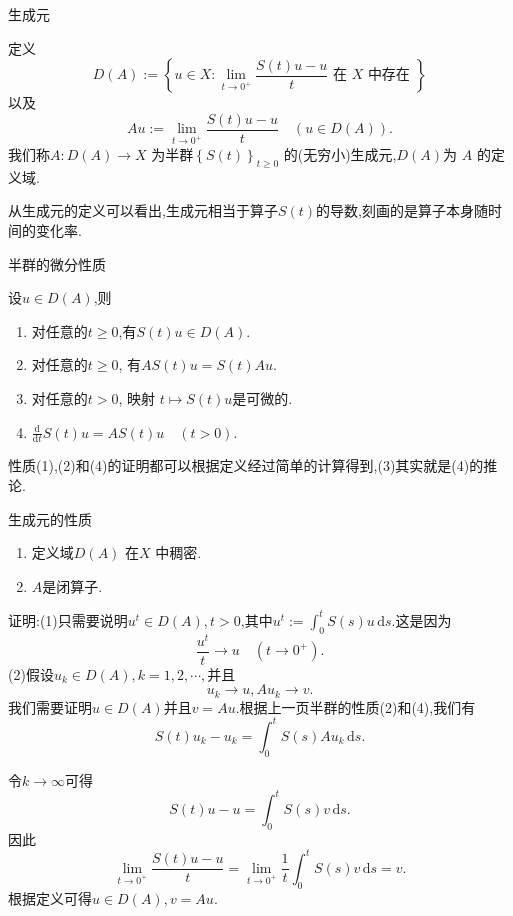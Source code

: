 \begin{frame}[t]{生成元}
  \begin{definition}
    定义
    \begin{equation}
      D(A):=\left\{u\in X: \lim_{t\to 0^{+}}\frac{S(t)u-u}{t}\text{ 在 } X  \text{ 中存在 }\right\}
    \end{equation}
    以及
    \begin{equation}
      Au:=\lim_{t\to 0^{+}}\frac{S(t)u-u}{t}\quad (u\in D(A)).
    \end{equation}
    我们称$A:D(A)\to X$ 为半群$\left\{S(t)\right\} _{t\ge 0}$ 的(无穷小)生成元,$D(A)$为 $A$ 的定义域.
  \end{definition}
  从生成元的定义可以看出,生成元相当于算子$S(t)$的导数,刻画的是算子本身随时间的变化率. 
\end{frame}
\begin{frame}[t]{半群的微分性质}
  \begin{theorem}
    设$u\in D(A)$,则
    \begin{enumerate}
      \item 对任意的$t\ge 0$,有$S(t)u \in D(A)$.
      \item 对任意的$t\ge 0$, 有$AS(t)u=S(t)Au$.
      \item 对任意的$t>0$, 映射 $t\mapsto S(t)u$是可微的.
      \item  $\frac{\mathrm{d}}{\mathrm{d}t}S(t)u=AS(t)u \quad (t>0)$.
    \end{enumerate}
  \end{theorem}
  性质(1),(2)和(4)的证明都可以根据定义经过简单的计算得到,(3)其实就是(4)的推论.
\end{frame}
\begin{frame}[t]{生成元的性质}
  \begin{theorem}
    \begin{enumerate}
      \item 定义域$D(A)$ 在$X$ 中稠密.
      \item $A$是闭算子.
    \end{enumerate}
  \end{theorem}
  证明:(1)只需要说明$u^{t}\in D(A),t>0$,其中$u^{t}:=\int_0^{t}S(s)u\,\mathrm{d}s$.这是因为
  \[
    \frac{u^{t}}{t}\to u\quad(t\to 0^{+}).
  \] 
  (2)假设$u_k \in D(A),k=1,2,\cdots,$并且
  \begin{equation}
    u_k\to u,Au_k\to v.
  \end{equation}
  我们需要证明$u\in D(A)$并且$v=Au$.根据上一页半群的性质(2)和(4),我们有
   \[
     S(t)u_k-u_k=\int_0^{t}S(s)Au_k\,\mathrm{d}s.
  \] 
\end{frame}
\begin{frame}[t]
  令$k\to \infty$可得
  \[
    S(t)u-u=\int_0^{t}S(s)v\,\mathrm{d}s.
  \] 
  因此
  \[
    \lim_{t\to 0^{+}}\frac{S(t)u-u}{t}=\lim_{t\to 0^{+}}\frac{1}{t}\int_0^{t}S(s)v\,\mathrm{d}s=v.
  \]
  根据定义可得$u\in D(A),v=Au$.
\end{frame}

